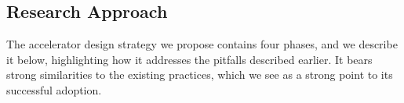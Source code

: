 \subsection{Research Approach} \label{sec:strategy}

The accelerator design strategy we propose contains four phases, and we
describe it below, highlighting how it addresses the pitfalls described
earlier. It bears strong similarities to the existing
practices, which we see as a strong point to its successful adoption.  

%

